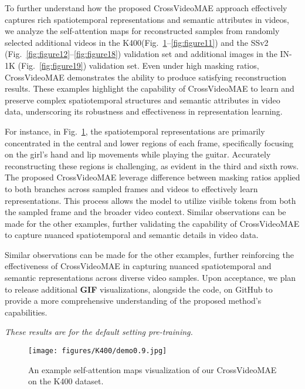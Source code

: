 To further understand how the proposed CrossVideoMAE approach effectively captures rich spatiotemporal representations and semantic attributes in videos, we analyze the self-attention maps for reconstructed samples from randomly selected additional videos in the K400(Fig.~\ref{fig:figure1}–\ref{fig:figure11}) and the SSv2 (Fig.~\ref{fig:figure12}–\ref{fig:figure18}) validation set and additional images in the IN-1K (Fig.~\ref{fig:figure19}) validation set. Even under high masking ratios, CrossVideoMAE demonstrates the ability to produce satisfying reconstruction results. These examples highlight the capability of CrossVideoMAE to learn and preserve complex spatiotemporal structures and semantic attributes in video data, underscoring its robustness and effectiveness in representation learning. 

For instance, in Fig.~\ref{fig:figure1}, the spatiotemporal representations are primarily concentrated in the central and lower regions of each frame, specifically focusing on the girl’s hand and lip movements while playing the guitar. Accurately reconstructing these regions is challenging, as evident in the third and sixth rows. The proposed CrossVideoMAE leverage difference between masking ratios applied to both branches across sampled frames and videos to effectively learn representations. This process allows the model to utilize visible tokens from both the sampled frame and the broader video context. Similar observations can be made for the other examples, further validating the capability of CrossVideoMAE to capture nuanced spatiotemporal and semantic details in video data.



Similar observations can be made for the other examples, further reinforcing the effectiveness of CrossVideoMAE in capturing nuanced spatiotemporal and semantic representations across diverse video samples. Upon acceptance, we plan to release additional \textbf{GIF} visualizations, alongside the code, on GitHub to provide a more comprehensive understanding of the proposed method's capabilities.

\noindent \textit{These results are for the default setting pre-training.}

\begin{figure}[h!]
\centering
\texttt{[image: figures/K400/demo0.9.jpg]}
\caption{An example self-attention maps visualization of our CrossVideoMAE on the K400 dataset.}
\label{fig:figure1}
\end{figure}


